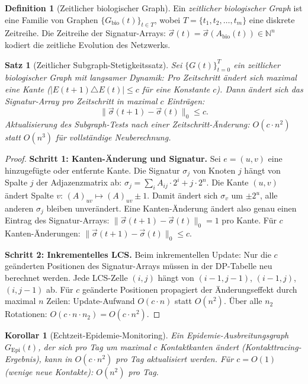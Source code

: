 ﻿\documentclass[a4paper,12pt]{article}
\theoremstyle{plain}
\newtheorem{satz}{Satz}
\newtheorem{korollar}{Korollar}
\theoremstyle{definition}
\newtheorem{definition}{Definition}
\theoremstyle{remark}
\newcommand{\Gepi}{G_{\mathrm{Epi}}}
\newcommand{\sigvec}{\vec{\sigma}}
\begin{document}
\begin{definition}[Zeitlicher biologischer Graph]
\label{def:zeitlich}
Ein \emph{zeitlicher biologischer Graph} ist eine Familie von Graphen
$\{G_{\mathrm{bio}}(t)\}_{t \in T}$, wobei $T = \{t_1, t_2, \ldots, t_m\}$
eine diskrete Zeitreihe.
Die Zeitreihe der Signatur-Arrays:
$\sigvec(t) = \sigvec(A_{\mathrm{bio}}(t)) \in \mathbb{N}^n$
kodiert die zeitliche Evolution des Netzwerks.
\end{definition}

\begin{satz}[Zeitlicher Subgraph-Stetigkeitssatz]
\label{satz:zeitlich}
Sei $\{G(t)\}_{t=0}^T$ ein zeitlicher biologischer Graph mit
langsamer Dynamik: Pro Zeitschritt \"andert sich maximal eine Kante
($|E(t+1) \triangle E(t)| \leq c$ f\"ur eine Konstante $c$).
Dann \"andert sich das Signatur-Array pro Zeitschritt in maximal $c$
Eintr\"agen:
\[
\|\sigvec(t+1) - \sigvec(t)\|_0 \leq c.
\]
Aktualisierung des Subgraph-Tests nach einer Zeitschritt-\"Anderung:
$O(c \cdot n^2)$ statt $O(n^3)$ f\"ur vollst\"andige Neuberechnung.
\end{satz}

\begin{proof}
\textbf{Schritt 1: Kanten-\"Anderung und Signatur.}
Sei $e = (u,v)$ eine hinzugef\"ugte oder entfernte Kante.
Die Signatur $\sigma_j$ von Knoten $j$ h\"angt von Spalte $j$ der
Adjazenzmatrix ab: $\sigma_j = \sum_i A_{ij} \cdot 2^i + j \cdot 2^n$.
Die Kante $(u,v)$ \"andert Spalte $v$: $(A)_{uv} \mapsto (A)_{uv} \pm 1$.
Damit \"andert sich $\sigma_v$ um $\pm 2^u$, alle anderen $\sigma_j$
bleiben unver\"andert.
Eine Kanten-\"Anderung \"andert also genau einen Eintrag des Signatur-Arrays:
$\|\sigvec(t+1) - \sigvec(t)\|_0 = 1$ pro Kante.
F\"ur $c$ Kanten-\"Anderungen: $\|\sigvec(t+1) - \sigvec(t)\|_0 \leq c$.

\textbf{Schritt 2: Inkrementelles LCS.}
Beim inkrementellen Update: Nur die $c$ ge\"anderten Positionen des Signatur-Arrays
m\"ussen in der DP-Tabelle neu berechnet werden.
Jede LCS-Zelle $(i, j)$ h\"angt von $(i-1,j-1)$, $(i-1,j)$, $(i,j-1)$ ab.
F\"ur $c$ ge\"anderte Positionen propagiert der \"Anderungseffekt durch maximal
$n$ Zeilen: Update-Aufwand $O(c \cdot n)$ statt $O(n^2)$.
\"Uber alle $n_2$ Rotationen: $O(c \cdot n \cdot n_2) = O(c \cdot n^2)$.
\end{proof}

\begin{korollar}[Echtzeit-Epidemie-Monitoring]
\label{kor:echtzeit_epi}
Ein Epidemie-Ausbreitungsgraph $\Gepi(t)$, der sich pro Tag um maximal
$c$ Kontaktkanten \"andert (Kontakttracing-Ergebnis),
kann in $O(c \cdot n^2)$ pro Tag aktualisiert werden.
F\"ur $c = O(1)$ (wenige neue Kontakte): $O(n^2)$ pro Tag.
\end{korollar}
\end{document}
